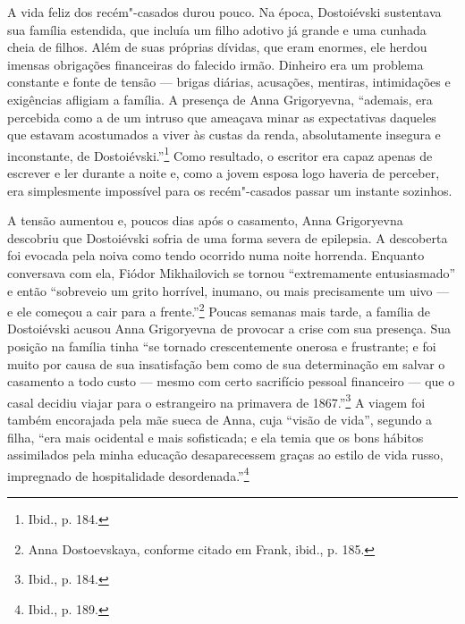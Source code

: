 A vida feliz dos recém"-casados durou pouco. Na época, Dostoiévski
sustentava sua família estendida, que incluía um filho adotivo já grande
e uma cunhada cheia de filhos. Além de suas próprias dívidas, que eram
enormes, ele herdou imensas obrigações financeiras do falecido irmão.
Dinheiro era um problema constante e fonte de tensão --- brigas diárias,
acusações, mentiras, intimidações e exigências afligiam a família. A
presença de Anna Grigoryevna, ``ademais, era percebida como a de um
intruso que ameaçava minar as expectativas daqueles que estavam
acostumados a viver às custas da renda, absolutamente insegura e
inconstante, de Dostoiévski.''\footnote{Ibid., p. 184.} Como resultado,
o escritor era capaz apenas de escrever e ler durante a noite e, como a
jovem esposa logo haveria de perceber, era simplesmente impossível para
os recém"-casados passar um instante sozinhos.

A tensão aumentou e, poucos dias após o casamento, Anna Grigoryevna
descobriu que Dostoiévski sofria de uma forma severa de epilepsia. A
descoberta foi evocada pela noiva como tendo ocorrido numa noite
horrenda. Enquanto conversava com ela, Fiódor Mikhailovich se tornou
``extremamente entusiasmado'' e então ``sobreveio um grito horrível,
inumano, ou mais precisamente um uivo --- e ele começou a cair para a
frente.''\footnote{Anna Dostoevskaya, conforme citado em Frank, ibid., p. 185.} Poucas semanas mais tarde, a família de Dostoiévski acusou Anna Grigoryevna de provocar a crise com sua presença. Sua posição na
família tinha ``se tornado crescentemente onerosa e frustrante; e foi
muito por causa de sua insatisfação bem como de sua determinação em
salvar o casamento a todo custo --- mesmo com certo sacrifício pessoal
financeiro --- que o casal decidiu viajar para o estrangeiro na primavera
de 1867.''\footnote{Ibid., p. 184.} A viagem foi também encorajada pela
mãe sueca de Anna, cuja ``visão de vida'', segundo a filha, ``era mais
ocidental e mais sofisticada; e ela temia que os bons hábitos
assimilados pela minha educação desaparecessem graças ao estilo de vida
russo, impregnado de hospitalidade desordenada.''\footnote{Ibid., p. 189.}

